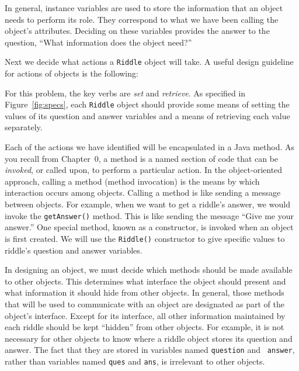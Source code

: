 In general, instance variables are used to store the information that
an object needs to perform its role.
They correspond to what we have been calling the object's
attributes. Deciding on these variables provides the answer to the
question, ``What information does the object need?''  

Next we decide what actions a {\tt Riddle} object will take.
A useful design guideline for actions of objects is the following:


\noindent For this problem,
the key verbs are {\it set} and {\it retrieve}.  As specified in
Figure~\ref{fig:specs}, each {\tt Riddle} object should provide some
means of setting the values of its question and answer variables and a
means of retrieving each value separately.

Each of the actions we have identified will be encapsulated in a Java
method. As you recall from Chapter~0, a method is a named section of
code that can be {\em invoked}, or called upon, to perform a
particular action. In the object-oriented approach, calling a method
(method invocation) is the means by which interaction occurs among
objects. Calling a method is like sending a message between
objects. For example, when we want to get a riddle's answer, we
would invoke the {\tt getAnswer()} method.  This is like sending the
message ``Give me your answer.''  One special method, known as a
constructor, is invoked when an object is first created. We will use
the {\tt Riddle()} constructor to give specific values to riddle's
question and answer variables.

In designing an object, we must decide which methods should be made
  available to other objects. This
determines what interface the object should present and what
information it should hide from other objects.  In general, those
methods that will be used to communicate with an object are designated
as part of the object's interface. Except for its interface, all other
information maintained by each riddle should be kept ``hidden'' from
other objects. For example, it is not necessary for other objects to
know where a riddle object stores its question and answer. The fact
that they are stored in variables named {\tt question} and {\tt
answer}, rather than variables named {\tt ques} and {\tt ans}, is
irrelevant to other objects.


